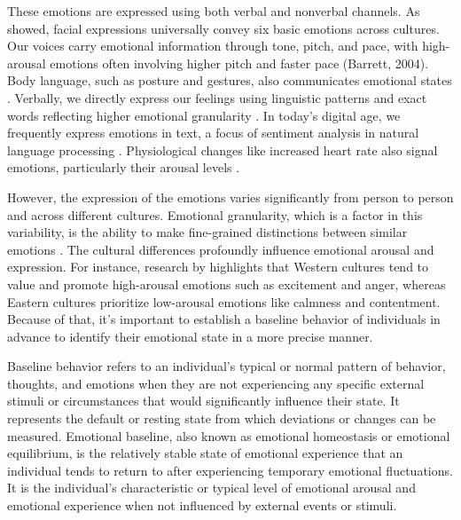 \par These emotions are expressed using both verbal and nonverbal channels. As \cite{ekman1971constants} showed, facial expressions universally convey six basic emotions across cultures. Our voices carry emotional information through tone, pitch, and pace, with high-arousal emotions often involving higher pitch and faster pace (Barrett, 2004). Body language, such as posture and gestures, also communicates emotional states \citep{ekman1971constants}. Verbally, we directly express our feelings using linguistic patterns and exact words reflecting higher emotional granularity \citep{smidt2015brief}. In today's digital age, we frequently express emotions in text, a focus of sentiment analysis in natural language processing \citep{lim2016cultural}. Physiological changes like increased heart rate also signal emotions, particularly their arousal levels \citep{barrett2004journal}. 

\par However, the expression of the emotions varies significantly from person to person and across different cultures. Emotional granularity, which is a factor in this variability, is the ability to make fine-grained distinctions between similar emotions \citep{smidt2015brief}. The cultural differences profoundly influence emotional arousal and expression. For instance, research by \citep{lim2016cultural} highlights that Western cultures tend to value and promote high-arousal emotions such as excitement and anger, whereas Eastern cultures prioritize low-arousal emotions like calmness and contentment. Because of that, it’s important to establish a baseline behavior of individuals in advance to identify their emotional state in a more precise manner.

\par Baseline behavior refers to an individual's typical or normal pattern of behavior, thoughts, and emotions when they are not experiencing any specific external stimuli or circumstances that would significantly influence their state. It represents the default or resting state from which deviations or changes can be measured. Emotional baseline, also known as emotional homeostasis or emotional equilibrium, is the relatively stable state of emotional experience that an individual tends to return to after experiencing temporary emotional fluctuations. It is the individual's characteristic or typical level of emotional arousal and emotional experience when not influenced by external events or stimuli. \citep{davidson1998affective} 











